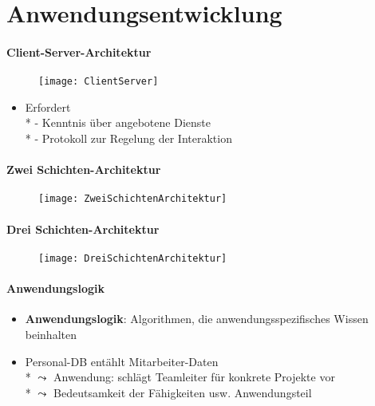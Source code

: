 \section{Anwendungsentwicklung}
\label{sec:anwendungeentwicklung}

\paragraph{Client-Server-Architektur}
\begin{figure}[H]\centering\label{ClientServer}\texttt{[image: ClientServer]}\end{figure}
\begin{itemize}
	\item Erfordert \\*
		- Kenntnis über angebotene Dienste \\*
		- Protokoll zur Regelung der Interaktion
\end{itemize}

\paragraph{Zwei Schichten-Architektur}
\begin{figure}[H]\centering\label{ZweiSchichtenArchitektur}\texttt{[image: ZweiSchichtenArchitektur]}\end{figure}

\paragraph{Drei Schichten-Architektur}
\begin{figure}[H]\centering\label{DreiSchichtenArchitektur}\texttt{[image: DreiSchichtenArchitektur]}\end{figure}

\paragraph{Anwendungslogik}
\begin{itemize}
	\item \textbf{Anwendungslogik}: Algorithmen, die anwendungsspezifisches Wissen beinhalten
	\item Personal-DB entählt Mitarbeiter-Daten
		\\*
		\( \leadsto \) Anwendung: schlägt Teamleiter für konkrete Projekte vor
		\\*
		\( \leadsto \) Bedeutsamkeit der Fähigkeiten usw. Anwendungsteil
\end{itemize}

